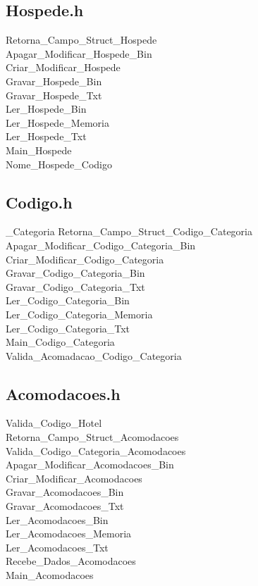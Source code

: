 \documentclass[titlepage]{article}
\begin{document}
	\subsection{Hospede.h}
	Retorna\_Campo\_Struct\_Hospede\\
	Apagar\_Modificar\_Hospede\_Bin\\
	Criar\_Modificar\_Hospede\\
	Gravar\_Hospede\_Bin\\
	Gravar\_Hospede\_Txt\\
	Ler\_Hospede\_Bin\\
	Ler\_Hospede\_Memoria\\
	Ler\_Hospede\_Txt\\
	Main\_Hospede\\
	Nome\_Hospede\_Codigo	
	
	\subsection{Codigo.h}\_Categoria
	Retorna\_Campo\_Struct\_Codigo\_Categoria\\
	Apagar\_Modificar\_Codigo\_Categoria\_Bin\\
	Criar\_Modificar\_Codigo\_Categoria\\
	Gravar\_Codigo\_Categoria\_Bin\\
	Gravar\_Codigo\_Categoria\_Txt\\
	Ler\_Codigo\_Categoria\_Bin\\
	Ler\_Codigo\_Categoria\_Memoria\\
	Ler\_Codigo\_Categoria\_Txt\\
	Main\_Codigo\_Categoria\\
	Valida\_Acomadacao\_Codigo\_Categoria\\
	
	\subsection{Acomodacoes.h}
	Valida\_Codigo\_Hotel\\
	Retorna\_Campo\_Struct\_Acomodacoes\\
	Valida\_Codigo\_Categoria\_Acomodacoes\\
	Apagar\_Modificar\_Acomodacoes\_Bin\\
	Criar\_Modificar\_Acomodacoes\\
	Gravar\_Acomodacoes\_Bin\\
	Gravar\_Acomodacoes\_Txt\\
	Ler\_Acomodacoes\_Bin\\
	Ler\_Acomodacoes\_Memoria\\
	Ler\_Acomodacoes\_Txt\\
	Recebe\_Dados\_Acomodacoes\\
	Main\_Acomodacoes\\
	
\end{document}
